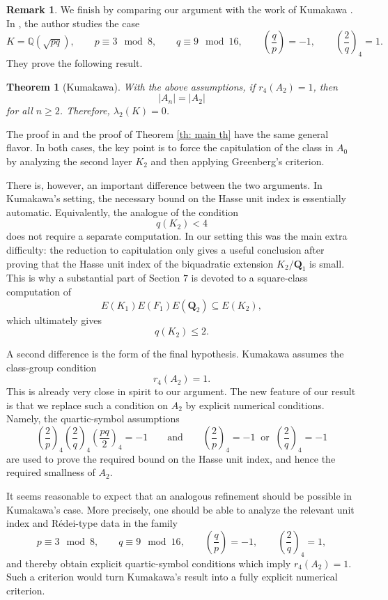\documentclass{article}
\numberwithin{equation}{section}
\theoremstyle{plain}  %
\newtheorem*{theorem*}{Theorem}   %
\theoremstyle{definition}
\newtheorem{remark}{Remark}[section]
\newcommand{\Q}{\mathbb{Q}}
\begin{document}
\begin{remark}
We finish by comparing our argument with the work of Kumakawa \cite{MR4262274}.
In \cite{MR4262274}, the author studies the case
\[
K=\Q(\sqrt{pq}), \qquad
p \equiv 3 \mod 8, \qquad q\equiv 9 \mod {16}, \qquad
\left(\frac{q}{p}\right)=-1, \qquad
\left(\frac{2}{q}\right)_4=1 .
\]
They prove the following result.
\begin{theorem*}[Kumakawa]
With the above assumptions, if $r_4(A_2)=1$, then
\[
|A_n|=|A_2|
\]
for all $n \geq 2$. Therefore, $\lambda_2(K)=0$.
\end{theorem*}

The proof in \cite{MR4262274} and the proof of Theorem \ref{th: main th}
have the same general flavor. In both cases, the key point is to force the
capitulation of the class in $A_0$ by analyzing the second layer $K_2$ and
then applying Greenberg's criterion. 

There is, however, an important difference between the two arguments. In
Kumakawa's setting, the necessary bound on the Hasse unit index is essentially
automatic. Equivalently, the analogue of the condition
\[
q(K_2)<4
\]
does not require a separate computation. In our setting this was the main
extra difficulty: the reduction to capitulation only gives a useful conclusion
after proving that the Hasse unit index of the biquadratic extension
$K_2/\mathbf Q_1$ is small. This is why a substantial part of Section $7$
is devoted to a square-class computation of
\[
E(K_1)E(F_1)E(\mathbf Q_2)\subseteq E(K_2),
\]
which ultimately gives
\[
q(K_2)\leq 2.
\]


A second difference is the form of the final hypothesis. Kumakawa assumes the
class-group condition
\[
r_4(A_2)=1.
\]
This is already very close in spirit to our argument. The new feature of our result is that we replace
such a condition on $A_2$ by explicit numerical conditions. Namely, the
quartic-symbol assumptions
\[
\left(\frac{2}{p}\right)_4
\left(\frac{2}{q}\right)_4
\left(\frac{pq}{2}\right)_4=-1
\qquad\text{and}\qquad
\left(\frac{2}{p}\right)_4=-1
\ \text{ or }\
\left(\frac{2}{q}\right)_4=-1
\]
are used to prove the required bound on the Hasse unit index, and hence the
required smallness of $A_2$. 

It seems reasonable to expect that an analogous refinement should be possible
in Kumakawa's case. More precisely, one should be able to analyze the relevant
unit index and R\'edei-type data in the family
\[
p \equiv 3 \mod 8, \qquad q\equiv 9 \mod {16}, \qquad
\left(\frac{q}{p}\right)=-1, \qquad
\left(\frac{2}{q}\right)_4=1,
\]
and thereby obtain explicit quartic-symbol conditions which imply
$r_4(A_2)=1$. Such a criterion would turn Kumakawa's result into a fully
explicit numerical criterion.
\end{remark}
\end{document}
